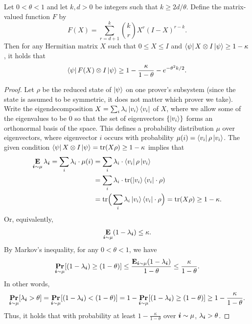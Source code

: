 \begin{lemma}
  \label{lem:chernoff-bernoulli-matrix}
  Let $0 < \theta < 1$ and let $k, d > 0$ be integers such that $k \geq 2d/\theta$.
  Define the matrix-valued function $F$ by
  \[ F(X) = \sum_{r = d+1}^{k} \binom{k}{r} X^r (I - X)^{r - k}. \]
  Then for any Hermitian matrix $X$ such that $0 \leq X \leq I$ and $\bra{\psi} X \otimes I
  \ket{\psi} \geq 1 - \kappa$, it holds that
  \[ \bra{\psi} F(X) \otimes I \ket{\psi} \geq 1 - \frac{\kappa}{1 - \theta}
    - e^{-\theta^2 k/2}. \]
  \end{lemma}
  \begin{proof}
    Let $\rho$ be the reduced state of $\ket{\psi}$ on one prover's
    subsystem (since the state is assumed to be symmetric, it does not
    matter which prover we take).
    Write the eigendecomposition $X = \sum_{i} \lambda_i
    \ket{v_i}\bra{v_i}$ of $X$, where we allow some of the
    eigenvalues to be $0$ so that the set of eigenvectors
    $\{\ket{v_i}\}$ forms an orthonormal basis of the space. This defines a probability
    distribution $\mu$ over eigenvectors, where eigenvector $i$
    occurs with probability $\mu(i) = \bra{v_i} \rho \ket{v_i}$. The
    given condition $\bra{\psi} X \otimes I \ket{\psi} = \mathrm{tr}(X \rho) \geq
    1 -\kappa$ implies that
    \begin{align*}
      \mathop{\bf E\/}_{\boldsymbol{i} \sim \mu} \lambda_{\boldsymbol{i}}
      = \sum_i \lambda_i \cdot \mu(i)
       &= \sum_i \lambda_i \cdot \bra{v_i} \rho \ket{v_i}\\
       &=\sum_i \lambda_i \cdot \mathrm{tr}(\ket{v_i} \bra{v_i}  \cdot \rho)\\
       &=\mathrm{tr} \Big(\sum_i \lambda_i  \ket{v_i} \bra{v_i} \cdot\rho\Big)
       = \mathrm{tr}(X \rho)
       \geq 1 - \kappa.
     \end{align*}
     Or, equivalently,
     \begin{equation*}
      \mathop{\bf E\/}_{\boldsymbol{i} \sim \mu} ( 1 -\lambda_{\boldsymbol{i}}) \leq \kappa.
    \end{equation*}
      By Markov's inequality, for any $0 < \theta < 1$, we have
     \begin{equation*}
     \mathop{\bf Pr\/}_{\boldsymbol{i} \sim \mu}[(1-\lambda_{\boldsymbol{i}}) \geq (1 - \theta)]
     \leq \frac{\mathop{\bf E\/}_{\boldsymbol{i} \sim \mu} (1-\lambda_{\boldsymbol{i}})}{1-\theta}
     \leq \frac{\kappa}{1-\theta}.
     \end{equation*} 
     In other words,
     \begin{equation}\label{eq:in-other-words}
     \mathop{\bf Pr\/}_{\boldsymbol{i} \sim \mu}[\lambda_{\boldsymbol{i}} > \theta]
     = \mathop{\bf Pr\/}_{\boldsymbol{i} \sim \mu}[(1 - \lambda_{\boldsymbol{i}}) < (1 - \theta)]
     = 1 - \mathop{\bf Pr\/}_{\boldsymbol{i} \sim \mu}[(1 - \lambda_{\boldsymbol{i}}) \geq (1 - \theta)]
     \geq 1 - \frac{\kappa}{1-\theta}.  
     \end{equation}
      Thus, it  holds that with probability at least $1 - \frac{\kappa}{1 - \theta}$ over $\boldsymbol{i} \sim
    \mu$, $\lambda_{\boldsymbol{i}} > \theta$.


\end{proof}
